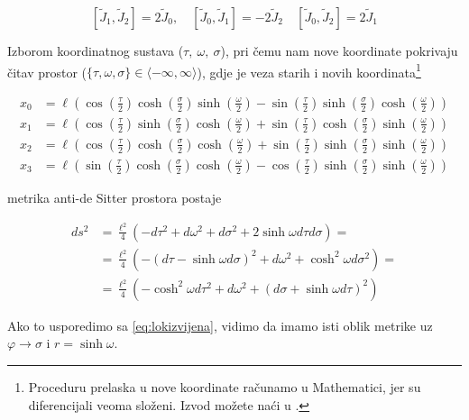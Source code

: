 $$[\tilde{J}_1,\tilde{J}_2]=2\tilde{J}_0,\quad [\tilde{J}_0,\tilde{J}_1]=-2\tilde{J}_2\quad [\tilde{J}_0,\tilde{J}_2]=2\tilde{J}_1$$

\noindent Izborom koordinatnog sustava ($\tau,\ \omega,\ \sigma$), pri čemu nam nove koordinate pokrivaju čitav prostor ($\{\tau,\omega,\sigma\}\in \langle-\infty,\infty\rangle$), gdje je veza starih i novih koordinata\footnote{Proceduru prelaska u nove koordinate računamo u Mathematici, jer su diferencijali veoma složeni. Izvod možete naći u \citep{Coussaert:1994tu}.}

\begin{equation*}
\begin{split}
x_0&=\ell\left(\cos\left(\frac{\tau}{2}\right)\cosh\left(\frac{\sigma}{2}\right)\sinh\left(\frac{\omega}{2}\right)-\sin\left(\frac{\tau}{2}\right)\sinh\left(\frac{\sigma}{2}\right)\cosh\left(\frac{\omega}{2}\right)\right)\\
x_1&=\ell\left(\cos\left(\frac{\tau}{2}\right)\sinh\left(\frac{\sigma}{2}\right)\cosh\left(\frac{\omega}{2}\right)+\sin\left(\frac{\tau}{2}\right)\cosh\left(\frac{\sigma}{2}\right)\sinh\left(\frac{\omega}{2}\right)\right)\\
x_2&=\ell\left(\cos\left(\frac{\tau}{2}\right)\cosh\left(\frac{\sigma}{2}\right)\cosh\left(\frac{\omega}{2}\right)+\sin\left(\frac{\tau}{2}\right)\sinh\left(\frac{\sigma}{2}\right)\sinh\left(\frac{\omega}{2}\right)\right)\\
x_3&=\ell\left(\sin\left(\frac{\tau}{2}\right)\cosh\left(\frac{\sigma}{2}\right)\cosh\left(\frac{\omega}{2}\right)-\cos\left(\frac{\tau}{2}\right)\sinh\left(\frac{\sigma}{2}\right)\sinh\left(\frac{\omega}{2}\right)\right)
\end{split}
\end{equation*}

\noindent metrika anti-de Sitter prostora postaje

\begin{equation*}
\begin{split}
ds^2&=\frac{\ell^2}{4}(-d\tau^2+d\omega^2+d\sigma^2+2\sinh \omega d\tau d\sigma)=\\
&=\frac{\ell^2}{4}\left(-(d\tau-\sinh \omega d\sigma)^2+d\omega^2+\cosh^2 \omega d\sigma^2\right)=\\
&=\frac{\ell^2}{4}\left(-\cosh^2\omega d\tau^2+d\omega^2+(d\sigma+\sinh \omega d\tau)^2\right)
\end{split}
\end{equation*}

\noindent Ako to usporedimo sa \eqref{eq:lokizvijena}, vidimo da imamo isti oblik metrike uz $\varphi\to\sigma$ i $r=\sinh\omega$.

